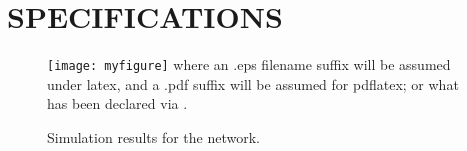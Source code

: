 \documentclass[conference]{IEEEtran}
\begin{document}
\section{SPECIFICATIONS} %
\label{sec:specifications}

\begin{figure}[h]
\centering
\texttt{[image: myfigure]}
where an .eps filename suffix will be assumed under latex, 
and a .pdf suffix will be assumed for pdflatex; or what has been declared
via \DeclareGraphicsExtensions.
\caption{Simulation results for the network.}
\label{fig_sim}
\end{figure}







\end{document}
